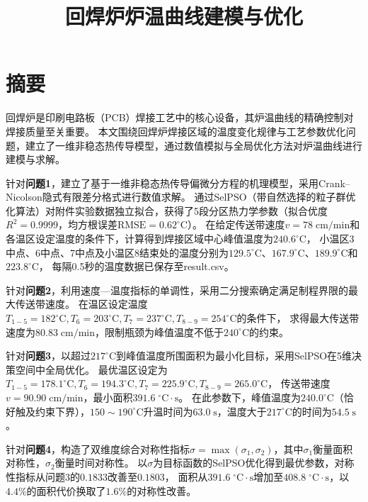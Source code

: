 \documentclass[12pt,a4paper]{ctexart}
\title{\vspace{-2cm}\textbf{回焊炉炉温曲线建模与优化}}
\author{}
\date{}
\begin{document}
\maketitle
\thispagestyle{empty}

\section*{摘\quad 要}
\thispagestyle{fancy}

回焊炉是印刷电路板（PCB）焊接工艺中的核心设备，其炉温曲线的精确控制对焊接质量至关重要。
本文围绕回焊炉焊接区域的温度变化规律与工艺参数优化问题，建立了一维非稳态热传导模型，通过数值模拟与全局优化方法对炉温曲线进行建模与求解。

针对\textbf{问题1}，建立了基于一维非稳态热传导偏微分方程的机理模型，采用Crank--Nicolson隐式有限差分格式进行数值求解。
通过SelPSO（带自然选择的粒子群优化算法）对附件实验数据独立拟合，获得了5段分区热力学参数（拟合优度$R^2=0.9999$，均方根误差$\mathrm{RMSE}=0.62^{\circ}\mathrm{C}$）。
在给定传送带速度$v=78\;\mathrm{cm/min}$和各温区设定温度的条件下，计算得到焊接区域中心峰值温度为$240.6^{\circ}\mathrm{C}$，
小温区3中点、6中点、7中点及小温区8结束处的温度分别为$129.5^{\circ}\mathrm{C}$、$167.9^{\circ}\mathrm{C}$、$189.9^{\circ}\mathrm{C}$和$223.8^{\circ}\mathrm{C}$，
每隔0.5秒的温度数据已保存至result.csv。

针对\textbf{问题2}，利用速度—温度指标的单调性，采用二分搜索确定满足制程界限的最大传送带速度。
在温区设定温度$T_{1-5}=182^{\circ}\mathrm{C},T_6=203^{\circ}\mathrm{C},T_7=237^{\circ}\mathrm{C},T_{8-9}=254^{\circ}\mathrm{C}$的条件下，
求得最大传送带速度为$\boldsymbol{80.83\;\mathrm{cm/min}}$，限制瓶颈为峰值温度不低于$240^{\circ}\mathrm{C}$的约束。

针对\textbf{问题3}，以超过$217^{\circ}\mathrm{C}$到峰值温度所围面积为最小化目标，采用SelPSO在5维决策空间中全局优化。
最优温区设定为$T_{1-5}=178.1^{\circ}\mathrm{C},T_6=194.3^{\circ}\mathrm{C},T_7=225.9^{\circ}\mathrm{C},T_{8-9}=265.0^{\circ}\mathrm{C}$，
传送带速度$v=90.90\;\mathrm{cm/min}$，最小面积$\boldsymbol{391.6\;^{\circ}\mathrm{C}\!\cdot\!\mathrm{s}}$。
在此参数下，峰值温度为$240.0^{\circ}\mathrm{C}$（恰好触及约束下界），$150\sim190^{\circ}\mathrm{C}$升温时间为$63.0\;\mathrm{s}$，温度大于$217^{\circ}\mathrm{C}$的时间为$54.5\;\mathrm{s}$。

针对\textbf{问题4}，构造了双维度综合对称性指标$\sigma=\max(\sigma_1,\sigma_2)$，其中$\sigma_1$衡量面积对称性，$\sigma_2$衡量时间对称性。
以$\sigma$为目标函数的SelPSO优化得到最优参数，对称性指标从问题3的$0.1833$改善至$\boldsymbol{0.1803}$，
面积从$391.6\;^{\circ}\mathrm{C}\!\cdot\!\mathrm{s}$增加至$408.8\;^{\circ}\mathrm{C}\!\cdot\!\mathrm{s}$，以$4.4\%$的面积代价换取了$1.6\%$的对称性改善。
\end{document}
